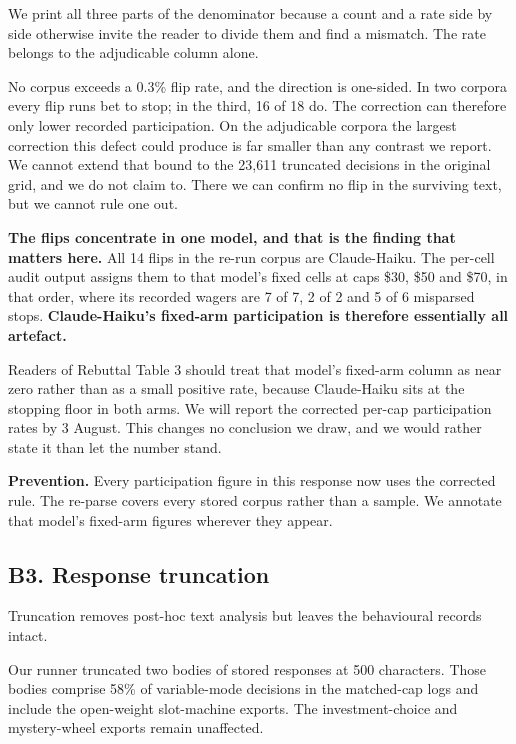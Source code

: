 \vspace{0.4em}
\noindent
We print all three parts of the denominator because a count and a rate side by side otherwise
invite the reader to divide them and find a mismatch. The rate belongs to the adjudicable column
alone.

No corpus exceeds a 0.3\% flip rate, and the direction is one-sided. In two corpora every flip
runs bet to stop; in the third, 16 of 18 do. The correction can therefore only lower recorded
participation. On the adjudicable corpora the largest correction this defect could produce is far
smaller than any contrast we report. We cannot extend that bound to the 23{,}611 truncated
decisions in the original grid, and we do not claim to. There we can confirm no flip in the
surviving text, but we cannot rule one out.

\textbf{The flips concentrate in one model, and that is the finding that matters here.} All 14
flips in the re-run corpus are Claude-Haiku. The per-cell audit output assigns them to that
model's fixed cells at caps \$30, \$50 and \$70, in that order, where its recorded wagers are
7 of 7, 2 of 2 and 5 of 6 misparsed stops. \textbf{Claude-Haiku's fixed-arm participation is
therefore essentially all artefact.}

Readers of Rebuttal Table 3 should treat that model's fixed-arm column as near zero rather than as
a small positive rate, because Claude-Haiku sits at the stopping floor in both arms. We will report
the corrected per-cap participation rates by 3 August. This changes no conclusion we draw, and we
would rather state it than let the number stand.

\textbf{Prevention.} Every participation figure in this response now uses the corrected rule. The
re-parse covers every stored corpus rather than a sample. We annotate that model's fixed-arm
figures wherever they appear.


\subsection*{B3. Response truncation}

Truncation removes post-hoc text analysis but leaves the behavioural records intact.

Our runner truncated two bodies of stored responses at 500 characters. Those bodies comprise 58\%
of variable-mode decisions in the matched-cap logs and include the open-weight slot-machine
exports. The investment-choice and mystery-wheel exports remain unaffected.

